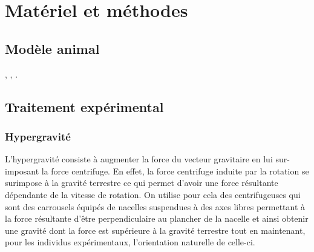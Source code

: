 \section{Matériel et méthodes}
\subsection{Modèle animal}

\lipsum[1] \citep{esson2005}, \citep{Davis1967,Thompson1953},  \citep{Shanks1994}.

\subsection{Traitement expérimental}

\subsubsection{Hypergravité} \label{descrip_centri}
L'hypergravité consiste à augmenter la force du vecteur gravitaire en lui sur-imposant la force centrifuge. En effet, la force centrifuge induite par la rotation se surimpose à la gravité terrestre ce qui permet d'avoir une force résultante dépendante de la vitesse de rotation. On utilise pour cela des centrifugeuses qui sont des carrousels équipés de nacelles suspendues à des axes libres permettant à la force résultante d'être perpendiculaire au plancher de la nacelle et ainsi obtenir une \og gravité \fg{} dont la force est supérieure à la gravité terrestre tout en maintenant, pour les individus expérimentaux, l'orientation \og naturelle \fg{} de celle-ci.
\lipsum[1-5]

